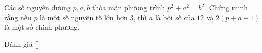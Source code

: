 \ifshowproblem
\begin{problem}\label{problem:GBR-2015-MO1-P2}
    Các số nguyên dương \( p, a, b \) thỏa mãn phương trình \( p^2 + a^2 = b^2 \).  
    Chứng minh rằng nếu \( p \) là một số nguyên tố lớn hơn \( 3 \),
    thì \( a \) là bội số của \( 12 \) và \( 2(p + a + 1) \) là một số chính phương.
\end{problem}
\fi

\ifshowinfo
Đánh giá [\textbf{}]
\fi